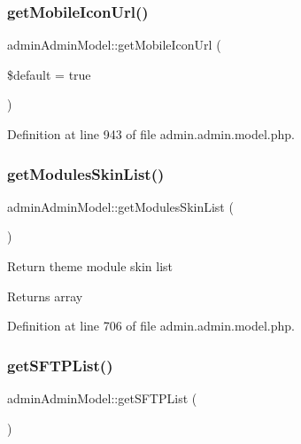 \mbox{\label{classadminAdminModel_a3ebcb91feca1cf88d6ed0bce9355ca6b}} 
\subsubsection{\texorpdfstring{get\+Mobile\+Icon\+Url()}{getMobileIconUrl()}}
{\footnotesize\ttfamily admin\+Admin\+Model\+::get\+Mobile\+Icon\+Url (\begin{DoxyParamCaption}\item[{}]{\$default = {\ttfamily true} }\end{DoxyParamCaption})}



Definition at line 943 of file admin.\+admin.\+model.\+php.

\mbox{\label{classadminAdminModel_adde903c6e5edecd8b68b1afb232c92fe}} 
\subsubsection{\texorpdfstring{get\+Modules\+Skin\+List()}{getModulesSkinList()}}
{\footnotesize\ttfamily admin\+Admin\+Model\+::get\+Modules\+Skin\+List (\begin{DoxyParamCaption}{ }\end{DoxyParamCaption})}

Return theme module skin list \begin{DoxyReturn}{Returns}
array 
\end{DoxyReturn}


Definition at line 706 of file admin.\+admin.\+model.\+php.

\mbox{\label{classadminAdminModel_adea58838b8595a28dc84d562bd1816ed}} 
\subsubsection{\texorpdfstring{get\+S\+F\+T\+P\+List()}{getSFTPList()}}
{\footnotesize\ttfamily admin\+Admin\+Model\+::get\+S\+F\+T\+P\+List (\begin{DoxyParamCaption}{ }\end{DoxyParamCaption})}

